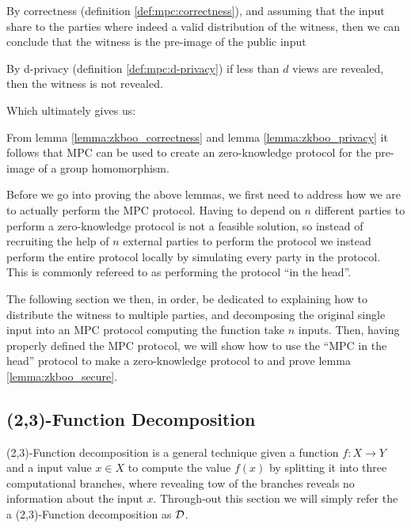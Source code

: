 \begin{lemma}
\label{lemma:zkboo_correctness}
By correctness (definition \ref{def:mpc:correctness}), and assuming that
the input share to the parties where indeed a valid distribution of the
witness, then we can conclude that the witness is the pre-image of the public input
\end{lemma}

\begin{lemma}
\label{lemma:zkboo_privacy}
By d-privacy (definition \ref{def:mpc:d-privacy}) if less than $d$ views are
revealed, then the witness is not revealed.
\end{lemma}

Which ultimately gives us:

\begin{lemma}
\label{lemma:zkboo_secure}
From lemma \ref{lemma:zkboo_correctness} and lemma \ref{lemma:zkboo_privacy} it
follows that MPC can be used to create an zero-knowledge protocol for the
pre-image of a group homomorphism.
\end{lemma}

Before we go into proving the above lemmas, we first need to address how we are
to actually perform the MPC protocol. Having to depend on $n$ different parties
to perform a zero-knowledge protocol is not a feasible solution, so instead of
recruiting the help of $n$ external parties to perform the protocol we instead
perform the entire protocol locally by simulating every party in the protocol.
This is commonly refereed to as performing the protocol ``in the head''.


The following section we then, in order, be dedicated to explaining how to
distribute the witness to multiple parties, and decomposing the original single
input into an MPC protocol computing the function take $n$ inputs. Then, having
properly defined the MPC protocol, we will show how to use the ``MPC in the
head'' protocol to make a zero-knowledge protocol to and prove lemma \ref{lemma:zkboo_secure}.

\subsection{(2,3)-Function Decomposition}
\label{subsec:decomposition}
(2,3)-Function decomposition is a general technique given a function
$f : X \rightarrow Y$ and a input value $x \in X$ to compute the value $f(x)$ by
splitting it into three computational branches, where revealing tow of the
branches reveals no information about the input $x$.
Through-out this section we will simply refer the a (2,3)-Function decomposition
as $\mathcal{D}$.

